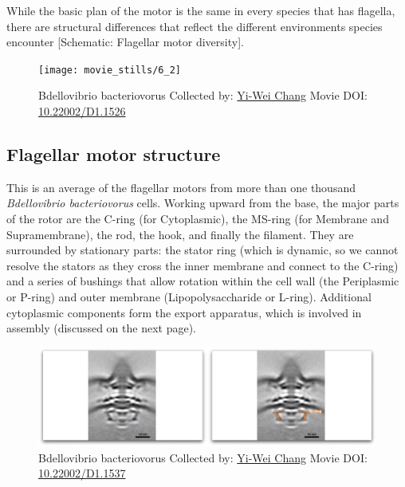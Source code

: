 \documentclass[]{tufte-book}
\begin{document}
While the basic plan of the motor is the same in every species that has
flagella, there are structural differences that reflect the different
environments species encounter {[}Schematic: Flagellar motor
diversity{]}.





\begin{figure}
\texttt{[image: movie\_stills/6\_2]} \caption[Bdellovibrio bacteriovorus Collected by:
\protect\hyperlink{yi-wei_chang}{Yi-Wei Chang} Movie DOI:
\href{https://doi.org/10.22002/D1.1526}{10.22002/D1.1526}]{Bdellovibrio bacteriovorus Collected by:
\protect\hyperlink{yi-wei_chang}{Yi-Wei Chang} Movie DOI:
\href{https://doi.org/10.22002/D1.1526}{10.22002/D1.1526}}\label{fig:6-2}
\end{figure}

\hypertarget{Flagellar_motor_structure}{\subsection{Flagellar motor
structure}\label{Flagellar_motor_structure}}

This is an average of the flagellar motors from more than one thousand
\emph{Bdellovibrio bacteriovorus} cells. Working upward from the base,
the major parts of the rotor are the C-ring (for Cytoplasmic), the
MS-ring (for Membrane and Supramembrane), the rod, the hook, and finally
the filament. They are surrounded by stationary parts: the stator ring
(which is dynamic, so we cannot resolve the stators as they cross the
inner membrane and connect to the C-ring) and a series of bushings that
allow rotation within the cell wall (the Periplasmic or P-ring) and
outer membrane (Lipopolysaccharide or L-ring). Additional cytoplasmic
components form the export apparatus, which is involved in assembly
(discussed on the next page).





\begin{figure}
\includegraphics{movie_stills/6_2a} \caption[Bdellovibrio bacteriovorus Collected by:
\protect\hyperlink{yi-wei_chang}{Yi-Wei Chang} Movie DOI:
\href{https://doi.org/10.22002/D1.1537}{10.22002/D1.1537}]{Bdellovibrio bacteriovorus Collected by:
\protect\hyperlink{yi-wei_chang}{Yi-Wei Chang} Movie DOI:
\href{https://doi.org/10.22002/D1.1537}{10.22002/D1.1537}}\label{fig:6-2a}
\end{figure}
\end{document}

